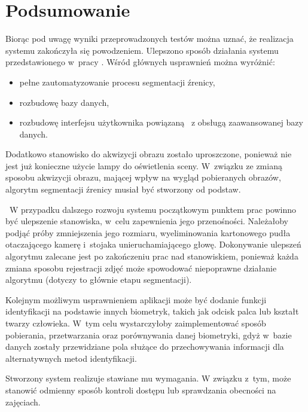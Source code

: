\chapter{Podsumowanie}
\label{cha:podsumowanie}

Biorąc pod uwagę wyniki przeprowadzonych testów można uznać, że realizacja systemu zakończyła się powodzeniem. Ulepszono sposób działania systemu przedstawionego w~pracy \cite{Gl11}. Wśród głównych usprawnień można wyróżnić:
\begin{itemize}
\item pełne zautomatyzowanie procesu segmentacji źrenicy,
\item rozbudowę bazy danych,
\item rozbudowę interfejsu użytkownika powiązaną ~z obsługą zaawansowanej bazy danych.
\end{itemize}

Dodatkowo stanowisko do akwizycji obrazu zostało uproszczone, ponieważ nie jest już konieczne użycie lampy do oświetlenia sceny. W~związku ze zmianą sposobu akwizycji obrazu, mającej wpływ na wygląd pobieranych obrazów, algorytm segmentacji źrenicy musiał być stworzony od podstaw. 

~W przypadku dalszego rozwoju systemu początkowym punktem prac powinno być ulepszenie stanowiska, w~celu zapewnienia jego przenośności. Należałoby podjąć próby zmniejszenia jego rozmiaru, wyeliminowania kartonowego pudła otaczającego kamerę i~stojaka unieruchamiającego głowę. Dokonywanie ulepszeń algorytmu zalecane jest po zakończeniu prac nad stanowiskiem, ponieważ każda zmiana sposobu rejestracji zdjęć może spowodować niepoprawne działanie algorytmu (dotyczy to głównie etapu segmentacji).

Kolejnym możliwym usprawnieniem aplikacji może być dodanie funkcji identyfikacji na podstawie innych biometryk, takich jak odcisk palca lub kształt twarzy człowieka. W~tym celu wystarczyłoby zaimplementować sposób pobierania, przetwarzania oraz porównywania danej biometryki, gdyż w~bazie danych zostały przewidziane pola służące do przechowywania informacji dla alternatywnych metod identyfikacji.

Stworzony system realizuje stawiane mu wymagania. W związku z~tym, może stanowić odmienny sposób kontroli dostępu lub sprawdzania obecności na zajęciach.
